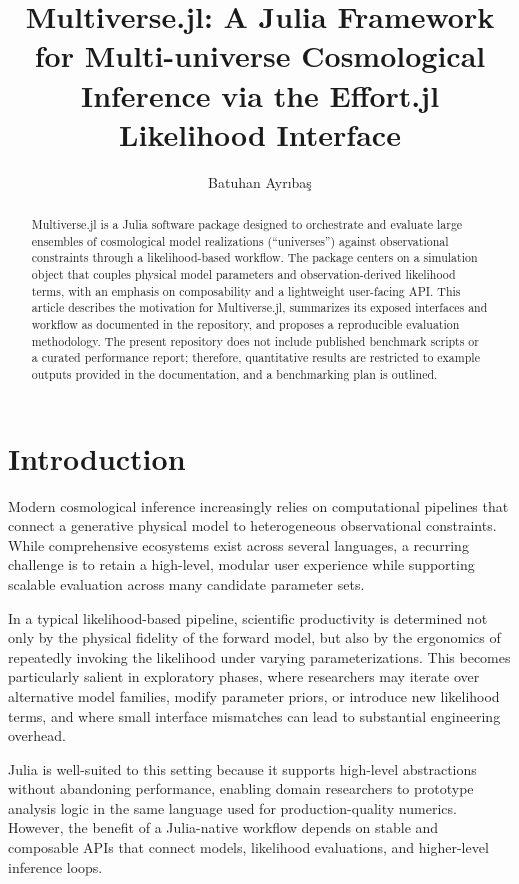 \documentclass[11pt]{article}
\title{Multiverse.jl: A Julia Framework for Multi-universe Cosmological Inference via the Effort.jl Likelihood Interface}
\author{Batuhan Ayr\i ba\c{s}}
\date{}
\begin{document}
\maketitle

\begin{abstract}
Multiverse.jl is a Julia software package designed to orchestrate and evaluate large ensembles of cosmological model realizations (``universes'') against observational constraints through a likelihood-based workflow.
The package centers on a simulation object that couples physical model parameters and observation-derived likelihood terms, with an emphasis on composability and a lightweight user-facing API.
This article describes the motivation for Multiverse.jl, summarizes its exposed interfaces and workflow as documented in the repository, and proposes a reproducible evaluation methodology.
The present repository does not include published benchmark scripts or a curated performance report; therefore, quantitative results are restricted to example outputs provided in the documentation, and a benchmarking plan is outlined.
\end{abstract}

\section{Introduction}
Modern cosmological inference increasingly relies on computational pipelines that connect a generative physical model to heterogeneous observational constraints.
While comprehensive ecosystems exist across several languages, a recurring challenge is to retain a high-level, modular user experience while supporting scalable evaluation across many candidate parameter sets.

In a typical likelihood-based pipeline, scientific productivity is determined not only by the physical fidelity of the forward model, but also by the ergonomics of repeatedly invoking the likelihood under varying parameterizations.
This becomes particularly salient in exploratory phases, where researchers may iterate over alternative model families, modify parameter priors, or introduce new likelihood terms, and where small interface mismatches can lead to substantial engineering overhead.

Julia is well-suited to this setting because it supports high-level abstractions without abandoning performance, enabling domain researchers to prototype analysis logic in the same language used for production-quality numerics.
However, the benefit of a Julia-native workflow depends on stable and composable APIs that connect models, likelihood evaluations, and higher-level inference loops.
\end{document}
